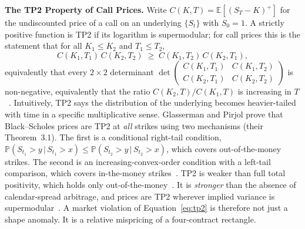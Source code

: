 \documentclass[sigconf,review]{acmart}
\begin{document}
\medskip\noindent\textbf{The TP2 Property of Call Prices.}
\label{sec:tp2theory}
Write $C(K,T)=\mathbb{E}[(S_T-K)^+]$ for the undiscounted price of a call on an underlying $\{S_t\}$ with $S_0=1$. A strictly positive function is TP2 if its logarithm is supermodular; for call prices this is the statement that for all $K_1\le K_2$ and $T_1\le T_2$,
\begin{equation}
C(K_1,T_1)\,C(K_2,T_2)\;\ge\;C(K_1,T_2)\,C(K_2,T_1),
\label{eq:tp2}
\end{equation}
equivalently that every $2\times2$ determinant $\det\left(\begin{smallmatrix} C(K_1,T_1) & C(K_1,T_2)\\ C(K_2,T_1) & C(K_2,T_2)\end{smallmatrix}\right)$ is non-negative, equivalently that the ratio $C(K_2,T)/C(K_1,T)$ is increasing in $T$~\cite{glasserman2026tp2theory}. Intuitively, TP2 says the distribution of the underlying becomes heavier-tailed with time in a specific multiplicative sense. Glasserman and Pirjol prove that Black--Scholes prices are TP2 at \emph{all} strikes using two mechanisms (their Theorem~3.1). The first is a conditional right-tail condition, $\mathbb{P}(S_{t_1}>y\,|\,S_{t_1}>x)\le\mathbb{P}(S_{t_2}>y\,|\,S_{t_2}>x)$, which covers out-of-the-money strikes. The second is an increasing-convex-order condition with a left-tail comparison, which covers in-the-money strikes~\cite{glasserman2026tp2theory}. TP2 is weaker than full total positivity, which holds only out-of-the-money~\cite{glasserman2023convexity}. It is \emph{stronger} than the absence of calendar-spread arbitrage, and prices are TP2 wherever implied variance is supermodular~\cite{glasserman2026tp2theory}. A market violation of Equation~\eqref{eq:tp2} is therefore not just a shape anomaly. It is a relative mispricing of a four-contract rectangle.
\end{document}
